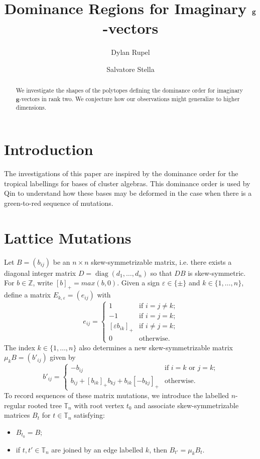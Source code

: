 \documentclass{amsart}
\title{Dominance Regions for Imaginary $\bfg$-vectors}
\author{Dylan Rupel}
\author{Salvatore Stella}
\numberwithin{theorem}{section}
\newcommand{\bfg}{\mathbf{g}}
\newcommand{\TT}{\mathbb{T}}
\newcommand{\ZZ}{\mathbb{Z}}
\newcommand{\diag}{\operatorname{diag}}
\begin{document}
  \begin{abstract}
    We investigate the shapes of the polytopes defining the dominance order for imaginary $\bfg$-vectors in rank two.
    We conjecture how our observations might generalize to higher dimensions.
  \end{abstract}
  \maketitle

  \section{Introduction}
  The investigations of this paper are inspired by the dominance order for the tropical labellings for bases of cluster algebras.
  This dominance order is used by Qin to understand how these bases may be deformed in the case when there is a green-to-red sequence of mutations.

  \section{Lattice Mutations}
  Let $B=(b_{ij})$ be an $n\times n$ skew-symmetrizable matrix, i.e. there exists a diagonal integer matrix $D=\diag(d_1,\ldots,d_n)$ so that $DB$ is skew-symmetric.
  For $b\in\ZZ$, write $[b]_+=max(b,0)$.
  Given a sign $\varepsilon\in\{\pm\}$ and $k\in\{1,\ldots,n\}$, define a matrix $E_{k,\varepsilon}=(e_{ij})$ with
  \[ e_{ij}=\begin{cases} 1 & \text{if $i=j\ne k$;}\\ -1 & \text{if $i=j=k$;}\\ [\varepsilon b_{ik}]_+ & \text{if $i\ne j=k$;}\\ 0 & \text{otherwise.} \end{cases} \]
  The index $k\in\{1,\ldots,n\}$ also determines a new skew-symmetrizable matrix $\mu_kB=(b'_{ij})$ given by
  \[ b'_{ij}=\begin{cases} -b_{ij} & \text{if $i=k$ or $j=k$;}\\ b_{ij}+[b_{ik}]_+b_{kj}+b_{ik}[-b_{kj}]_+ & \text{otherwise.} \end{cases} \]
  To record sequences of these matrix mutations, we introduce the labelled $n$-regular rooted tree $\TT_n$ with root vertex $t_0$ and associate skew-symmetrizable matrices $B_t$ for $t\in\TT_n$ satisfying:
  \begin{itemize}
    \item $B_{t_0}=B$;
    \item if $t,t'\in\TT_n$ are joined by an edge labelled $k$, then $B_{t'}=\mu_k B_t$.
  \end{itemize}
\end{document}
